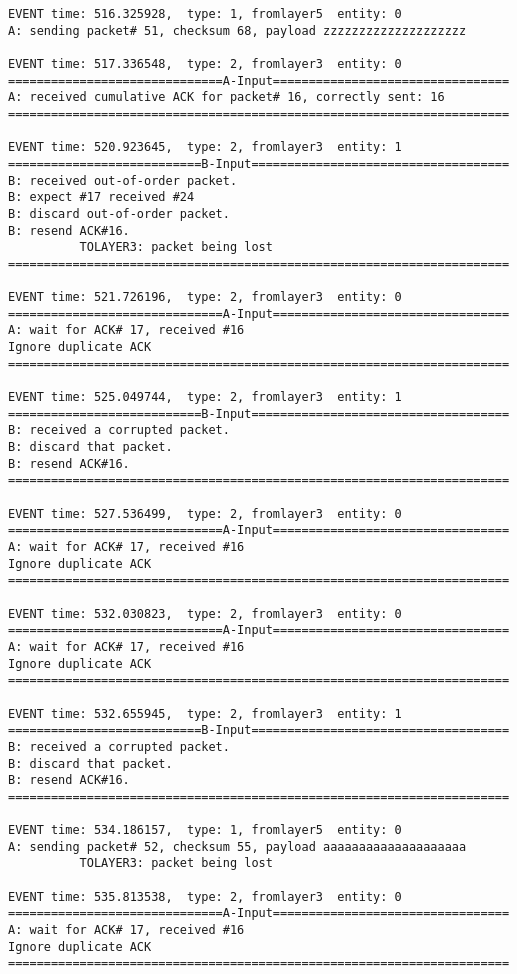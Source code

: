 \documentclass[12pt]{article}
\begin{document}
\begin{verbatim}
EVENT time: 516.325928,  type: 1, fromlayer5  entity: 0
A: sending packet# 51, checksum 68, payload zzzzzzzzzzzzzzzzzzzz

EVENT time: 517.336548,  type: 2, fromlayer3  entity: 0
==============================A-Input=================================
A: received cumulative ACK for packet# 16, correctly sent: 16
======================================================================

EVENT time: 520.923645,  type: 2, fromlayer3  entity: 1
===========================B-Input====================================
B: received out-of-order packet.
B: expect #17 received #24
B: discard out-of-order packet.
B: resend ACK#16.
          TOLAYER3: packet being lost
======================================================================

EVENT time: 521.726196,  type: 2, fromlayer3  entity: 0
==============================A-Input=================================
A: wait for ACK# 17, received #16
Ignore duplicate ACK
======================================================================

EVENT time: 525.049744,  type: 2, fromlayer3  entity: 1
===========================B-Input====================================
B: received a corrupted packet.
B: discard that packet.
B: resend ACK#16.
======================================================================

EVENT time: 527.536499,  type: 2, fromlayer3  entity: 0
==============================A-Input=================================
A: wait for ACK# 17, received #16
Ignore duplicate ACK
======================================================================

EVENT time: 532.030823,  type: 2, fromlayer3  entity: 0
==============================A-Input=================================
A: wait for ACK# 17, received #16
Ignore duplicate ACK
======================================================================

EVENT time: 532.655945,  type: 2, fromlayer3  entity: 1
===========================B-Input====================================
B: received a corrupted packet.
B: discard that packet.
B: resend ACK#16.
======================================================================

EVENT time: 534.186157,  type: 1, fromlayer5  entity: 0
A: sending packet# 52, checksum 55, payload aaaaaaaaaaaaaaaaaaaa
          TOLAYER3: packet being lost

EVENT time: 535.813538,  type: 2, fromlayer3  entity: 0
==============================A-Input=================================
A: wait for ACK# 17, received #16
Ignore duplicate ACK
======================================================================


\end{verbatim}
\end{document}
